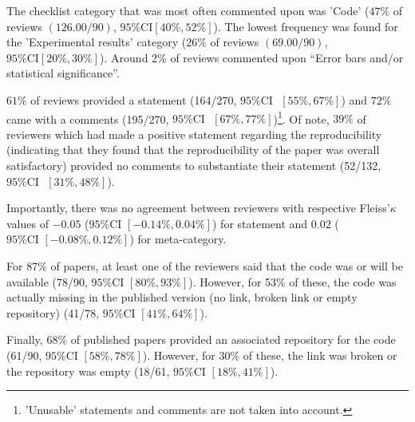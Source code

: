 The checklist category that was most often commented upon was 'Code' ($47\%$ of reviews $(126.00/90)$, $95\% \text{CI} [40\%, 52\%]$).
The lowest frequency was found for the 'Experimental results' category ($26\%$ of reviews $(69.00/90)$, $95\% \text{CI} [20\%, 30\%]$).
Around 2\% of reviews commented upon “Error bars and/or statistical significance”.

$61\%$ of reviews provided a statement (164/270, $95\% \text{CI }$ $[55\%, 67\%]$) and 
$72\%$ came with a comments (195/270, $95\% \text{CI }$ $[67\%, 77\%]$)\footnote{'Unusable' statements and comments are not taken into account.}. 
Of note, $39\%$ of reviewers which had made a positive statement regarding the reproducibility (indicating that they found that the reproducibility of the paper was overall satisfactory) provided no comments to substantiate their statement (52/132, $95\% \text{CI }$ $[31\%, 48\%]$).

Importantly, there was no agreement between reviewers with respective Fleiss'$\kappa$ values of $-0.05$ ($95\% \text{CI } [-0.14\%, 0.04\%]$) for statement 
and $0.02$ ($95\% \text{CI } [-0.08\%, 0.12\%]$) for meta-category.

For 87\% of papers, at least one of the reviewers said that the code was or will be available (78/90, $95\%\text{CI } [80\%, 93\%]$). 
However, for 53\% of these,  the code was actually missing in the published version (no link, broken link or empty repository) (41/78, $95\%\text{CI } [41\%, 64\%]$). 

Finally, 68\% of published papers provided an associated repository for the code (61/90, $95\%\text{CI } [58\%, 78\%]$). 
However, for 30\% of these, the link was broken or the repository was empty (18/61, $95\%\text{CI } [18\%, 41\%]$). 
